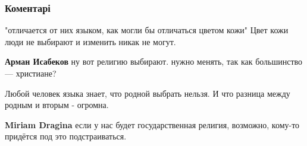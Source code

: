  
 
 
 
 
\subsubsection{Коментарі}
\label{sec:20_07_2021.fb.dragina_miriam.1.mova_jazyk_boris_hersonskij_odessa.cmt}

\begin{itemize}
 

"отличается от них языком, как могли бы отличаться цветом кожи"
Цвет кожи люди не выбирают и изменить никак не могут.

\begin{itemize}
 
\textbf{Арман Исабеков} ну вот религию выбирают. нужно менять, так как большинство — христиане?

 
Любой человек языка знает, что родной выбрать нельзя. И что разница между родным и вторым - огромна.

 
\textbf{Miriam Dragina} если у нас будет государственная религия, возможно, кому-то придётся под это подстраиваться.

 

\end{itemize}
\end{itemize}
